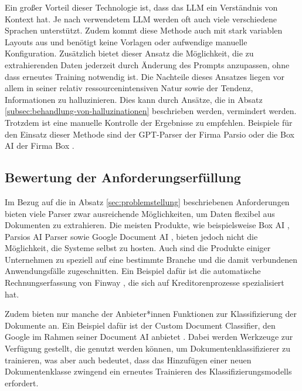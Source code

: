 Ein großer Vorteil dieser Technologie ist, dass das \gls{LLM} ein Verständnis von Kontext hat. Je nach verwendetem \gls{LLM} werden oft auch viele verschiedene Sprachen unterstützt. Zudem kommt diese Methode auch mit stark variablen Layouts aus und benötigt keine Vorlagen oder aufwendige manuelle Konfiguration. Zusätzlich bietet dieser Ansatz die Möglichkeit, die zu extrahierenden Daten jederzeit durch Änderung des Prompts anzupassen, ohne dass erneutes Training notwendig ist. Die Nachteile dieses Ansatzes liegen vor allem in seiner relativ ressourcenintensiven Natur sowie der Tendenz, Informationen zu halluzinieren. Dies kann durch Ansätze, die in Absatz \ref{subsec:behandlung-von-halluzinationen} beschrieben werden, vermindert werden. Trotzdem ist eine manuelle Kontrolle der Ergebnisse zu empfehlen. Beispiele für den Einsatz dieser Methode sind der GPT-Parser der Firma Parsio \cite{parsio_pdf_extraction} oder die Box AI der Firma Box \cite{box_ai}.

\subsection{Bewertung der Anforderungserfüllung}
\label{subsec:bewertung-im-bezug-auf-die-anforderungen}

Im Bezug auf die in Absatz \ref{sec:problemstellung} beschriebenen Anforderungen bieten viele Parser zwar ausreichende Möglichkeiten, um Daten flexibel aus Dokumenten zu extrahieren. Die meisten Produkte, wie beispielsweise Box AI \cite{box_ai}, Parsios AI Parser \cite{parsio_pdf_extraction} sowie Google Document AI \cite{google_documentAI}, bieten jedoch nicht die Möglichkeit, die Systeme selbst zu hosten. Auch sind die Produkte einiger Unternehmen zu speziell auf eine bestimmte Branche und die damit verbundenen Anwendungsfälle zugeschnitten. Ein Beispiel dafür ist die automatische Rechnungserfassung von Finway \cite{finway_automatische_rechnungserfassung}, die sich auf Kreditorenprozesse spezialisiert hat.

Zudem bieten nur manche der Anbieter*innen Funktionen zur Klassifizierung der Dokumente an. Ein Beispiel dafür ist der Custom Document Classifier, den Google im Rahmen seiner Document AI anbietet \cite{google_documentAiCustomClassifier}. Dabei werden Werkzeuge zur Verfügung gestellt, die genutzt werden können, um Dokumentenklassifizierer zu trainieren, was aber auch bedeutet, dass das Hinzufügen einer neuen Dokumentenklasse zwingend ein erneutes Trainieren des Klassifizierungsmodells erfordert.

